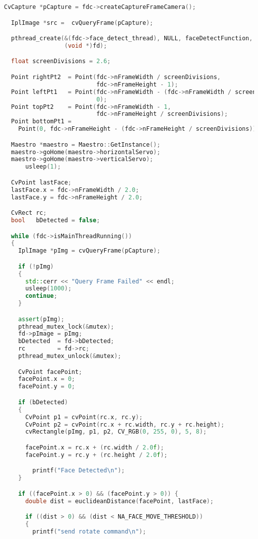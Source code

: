 \begin{lstlisting}[caption=face-detect.cpp,language=C++]
  CvCapture *pCapture = fdc->createCaptureFrameCamera();

  IplImage *src =  cvQueryFrame(pCapture);

  pthread_create(&(fdc->face_detect_thread), NULL, faceDetectFunction,
                 (void *)fd);

  float screenDivisions = 2.6;

  Point rightPt2  = Point(fdc->nFrameWidth / screenDivisions,
                          fdc->nFrameHeight - 1);
  Point leftPt1   = Point(fdc->nFrameWidth - (fdc->nFrameWidth / screenDivisions),
                          0);
  Point topPt2    = Point(fdc->nFrameWidth - 1,
                          fdc->nFrameHeight / screenDivisions);
  Point bottomPt1 =
    Point(0, fdc->nFrameHeight - (fdc->nFrameHeight / screenDivisions));

  Maestro *maestro = Maestro::GetInstance();
  maestro->goHome(maestro->horizontalServo);
  maestro->goHome(maestro->verticalServo);
      usleep(1);

  CvPoint lastFace;
  lastFace.x = fdc->nFrameWidth / 2.0;
  lastFace.y = fdc->nFrameHeight / 2.0;

  CvRect rc;
  bool   bDetected = false;

  while (fdc->isMainThreadRunning())
  {
    IplImage *pImg = cvQueryFrame(pCapture);

    if (!pImg)
    {
      std::cerr << "Query Frame Failed" << endl;
      usleep(1000);
      continue;
    }

    assert(pImg);
    pthread_mutex_lock(&mutex);
    fd->pImage = pImg;
    bDetected  = fd->bDetected;
    rc         = fd->rc;
    pthread_mutex_unlock(&mutex);

    CvPoint facePoint;
    facePoint.x = 0;
    facePoint.y = 0;

    if (bDetected)
    {
      CvPoint p1 = cvPoint(rc.x, rc.y);
      CvPoint p2 = cvPoint(rc.x + rc.width, rc.y + rc.height);
      cvRectangle(pImg, p1, p2, CV_RGB(0, 255, 0), 5, 8);

      facePoint.x = rc.x + (rc.width / 2.0f);
      facePoint.y = rc.y + (rc.height / 2.0f);

        printf("Face Detected\n");
    }

    if ((facePoint.x > 0) && (facePoint.y > 0)) {
      double dist = euclideanDistance(facePoint, lastFace);

      if ((dist > 0) && (dist < NA_FACE_MOVE_THRESHOLD))
      {
        printf("send rotate command\n");


\end{lstlisting}
